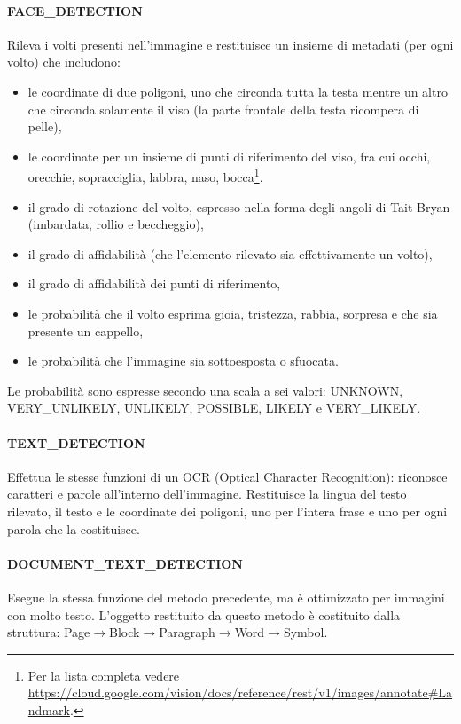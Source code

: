 \paragraph{\textsf{FACE\_DETECTION}} Rileva i volti presenti nell'immagine e restituisce un insieme di metadati (per ogni volto) che includono:
\begin{itemize}
\item le coordinate di due poligoni, uno che circonda tutta la testa mentre un altro che circonda solamente il viso (la parte frontale della testa ricompera di pelle),
\item le coordinate per un insieme di punti di riferimento del viso, fra cui occhi, orecchie, sopracciglia, labbra, naso, bocca\footnote{Per la lista completa vedere \url{https://cloud.google.com/vision/docs/reference/rest/v1/images/annotate\#Landmark}.}.
\item il grado di rotazione del volto, espresso nella forma degli angoli di Tait-Bryan (imbardata, rollio e beccheggio),
\item il grado di affidabilità (che l'elemento rilevato sia effettivamente un volto),
\item il grado di affidabilità dei punti di riferimento,
\item le probabilità che il volto esprima gioia, tristezza, rabbia, sorpresa e che sia presente un cappello,
\item le probabilità che l'immagine sia sottoesposta o sfuocata.
\end{itemize}
Le probabilità sono espresse secondo una scala a sei valori: \textsf{UNKNOWN}, \textsf{VERY\_UNLIKELY}, \textsf{UNLIKELY}, \textsf{POSSIBLE}, \textsf{LIKELY} e \textsf{VERY\_LIKELY}.
%
\paragraph{\textsf{TEXT\_DETECTION}} Effettua le stesse funzioni di un OCR (Optical Character Recognition): riconosce caratteri e parole all'interno dell'immagine.
Restituisce la lingua del testo rilevato, il testo e le coordinate dei poligoni, uno per l'intera frase e uno per ogni parola che la costituisce.
%
\paragraph{\textsf{DOCUMENT\_TEXT\_DETECTION}} Esegue la stessa funzione del metodo precedente, ma è ottimizzato per immagini con molto testo.
L'oggetto restituito da questo metodo è costituito dalla struttura: \textsf{Page}$\to$\textsf{Block}$\to$\textsf{Paragraph}$\to$\textsf{Word}$\to$\textsf{Symbol}.

